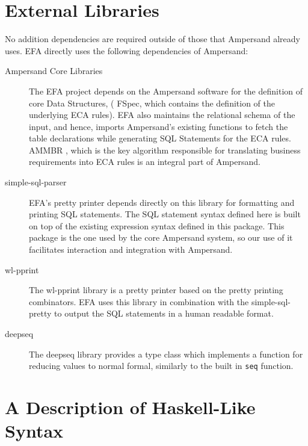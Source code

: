 \section{External Libraries}
\noindent No addition dependencies are required outside of those that Ampersand 
already uses. EFA directly uses the following dependencies of Ampersand:
\begin{description}
    \item[Ampersand Core Libraries]
    The EFA project depends on the Ampersand software for the definition of 
    core Data Structures, ( FSpec, which contains the definition of 
    the underlying ECA rules). EFA also maintains the relational schema of 
    the input, and hence, imports Ampersand's existing functions to fetch 
    the table declarations while generating SQL Statements for the ECA 
    rules. AMMBR \cite{AMMBR}, which is the key algorithm responsible for 
    translating business requirements into ECA rules is an integral part of 
    Ampersand.
    \item[simple-sql-parser]
    EFA's pretty printer depends directly on this library for formatting 
    and printing SQL statements. The SQL statement syntax 
    defined here is built on top of the existing expression syntax defined 
    in this package. This package is the one used by the core Ampersand system,
    so our use of it facilitates interaction and integration with Ampersand. 
    \cite{simple-sql}
    \item[wl-pprint] 
    The wl-pprint library\cite{wl-pprint} is a pretty printer based on the
    pretty printing combinators. EFA uses this library in combination with
    the simple-sql-pretty to output the SQL statements in a human readable
    format.
    \item[deepseq]
    The deepseq library provides a type class which implements a function
    for reducing values to normal formal, similarly to the built in
    \lstinline{seq} function.
\end{description}

\noindent
\section{A Description of Haskell-Like Syntax}\label{subsec:HaskellSyntax}

